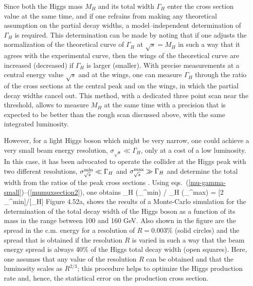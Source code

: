 Since both the Higgs mass $M_H$ and its total width $\Gamma_H$ enter the cross
section value at the same time, and if one refrains from making any theoretical
assumption on the  partial decay widths, a model--independent determination of
$\Gamma_H$ is required. This determination can be made
\cite{mu-Rev1,mulineshape} by noting that if one adjusts the normalization of
the theoretical curve of $\Gamma_H$ at $\sqrt{s}=M_H$ in such a way that it
agrees with the experimental curve, then the wings of the theoretical curve are
increased (decreased) if $\Gamma_H$ is larger (smaller).  With precise
measurements at a central energy value $\sqrt{s}$ and at the wings, one can
measure $\Gamma_H$ through the ratio of the cross sections at the central peak
and on the wings, in which the partial decay widths cancel out. This method,
with a dedicated three point scan near the threshold, allows to measure $M_H$
at the same time with a precision that is expected to be better than the 
rough scan discussed above, with the same integrated luminosity.\s

However, for a light Higgs boson which might be very narrow, one could achieve
a very small beam energy resolution, $\sigma_{\sqrt{s}} \ll \Gamma_H$, only at
a cost of a low luminosity. In this case, it has been advocated to operate
the collider  at the Higgs peak with two different resolutions, $\sigma_{\sqrt{
s}}^{\rm min} \ll \Gamma_H$ and $\sigma^{\rm max}_{ \sqrt{s}} \gg \Gamma_H$ 
and determine the total width from the ratios of the peak cross sections
\cite{mulineshape}. Using eqs.~(\ref{mu-gamma-small})--(\ref{mumuxsection2}), 
one obtains
\beq
\overline{\sigma}_H (\sigma_{}^{\rm min}) /
\overline{\sigma}_H (\sigma_{}^{\rm max}) = [2 \sigma_{}^{\rm min}]/[\sqrt \pi \Gamma_H]
\eeq
Figure 4.52a, shows the results of a Monte-Carlo simulation \cite{mu-Rev4}
for the determination of the total
decay width of the Higgs boson as a function of its mass in the range between
100 and 160 GeV. Also shown in the figure are the spread in the c.m. energy for
a resolution of $R = 0.003\%$ (solid circles) and the spread that is obtained
if the resolution $R$ is varied in such a way that the beam energy spread is
always 40\% of the Higgs total decay width (open squares). Here, one assumes
that any value of the resolution $R$ can be obtained and that the luminosity
scales as $R^{2/3}$;  this procedure helps to optimize the Higgs production
rate and, hence, the statistical error on the production cross section.\s


